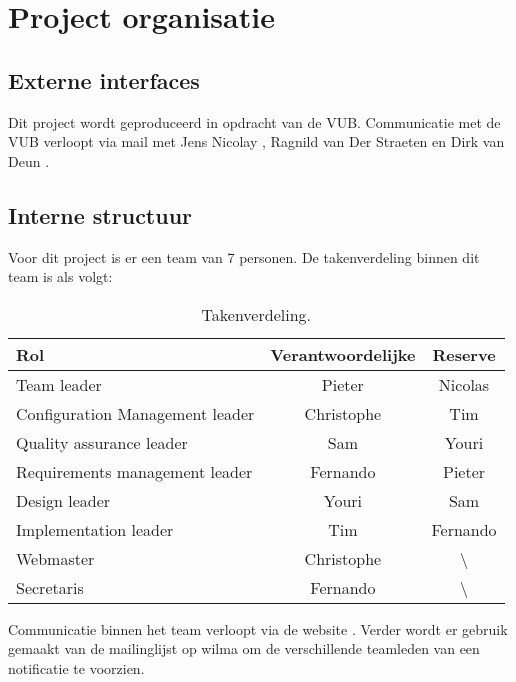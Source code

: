 \chapter{Project organisatie}
\section{Externe interfaces}
Dit project wordt geproduceerd in opdracht van de VUB. Communicatie met de VUB verloopt via mail met Jens Nicolay \cite{JensNicolay}, Ragnild van Der Straeten \cite{RagnhildVanDerStraeten} en Dirk van Deun \cite{DirkVanDeun}.
\section{Interne structuur}
Voor dit project is er een team van 7 personen. De takenverdeling binnen dit team is als volgt:
\begin{table} [H]
	\centering
	\caption{Takenverdeling.}
	\begin{tabular} {l|cc}
		Rol & Verantwoordelijke & Reserve \\
		\hline
		Team leader & Pieter & Nicolas \\
		Configuration Management leader & Christophe & Tim \\
		Quality assurance leader & Sam & Youri \\
		Requirements management leader & Fernando & Pieter \\
		Design leader & Youri & Sam \\
		Implementation leader & Tim & Fernando \\
		\hline
		Webmaster & Christophe & \textbackslash \\
		Secretaris & Fernando & \textbackslash 
	\end{tabular}
	\label{tab:takenverdeling}
\end{table}
Communicatie binnen het team verloopt via de website \cite{portalWebsite}. Verder wordt er gebruik gemaakt van de mailinglijst op wilma om de verschillende teamleden van een notificatie te voorzien.